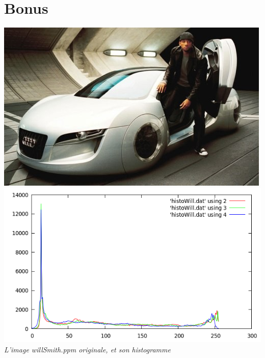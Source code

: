 \documentclass[a4paper,11pt]{article}
\begin{document}
\newpage
\section{Bonus}
\begin{center}
\includegraphics[scale=0.25]{will.png}
\includegraphics[scale=0.25]{histoWill.png}\\
\textit{L'image willSmith.ppm originale, et son histogramme}
\end{center}
\vspace*{0.5cm}
\end{document}

